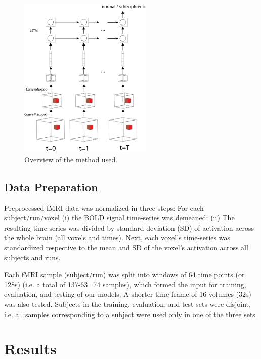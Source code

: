 \documentclass{article}
\begin{document}


\begin{figure}[t]
\begin{center}
\includegraphics[width=2.5in]{figures/overview.png}
\end{center}
\caption{Overview of the method used.}
\label{fig1}
\end{figure}

\subsection{Data Preparation}

Preprocessed fMRI data was normalized in three steps: For each subject/run/voxel (i) the BOLD signal time-series was demeaned; (ii) The resulting time-series was divided by standard deviation (SD) of activation across the whole brain (all voxels and times). Next, each voxel's time-series was standardized respective to the mean and SD of the voxel's activation across all subjects and runs.

Each fMRI sample (subject/run) was split into windows of 64 time points (or 128s) (i.e. a total of 137-63=74 samples), which formed the input for training, evaluation, and testing of our models. A shorter time-frame of 16 volumes (32s) was also tested. Subjects in the training, evaluation, and test sets were disjoint, i.e. all samples corresponding to a subject were used only in one of the three sets.

\section*{Results}
\end{document}
